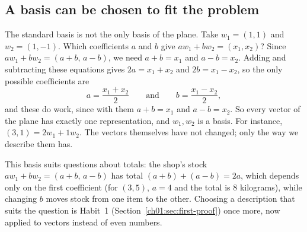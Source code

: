 \subsection*{A basis can be chosen to fit the problem}
The standard basis is not the only basis of the plane. Take $w_1=(1,1)$ and $w_2=(1,-1)$. Which coefficients $a$ and $b$ give $aw_1+bw_2=(x_1,x_2)$? Since $aw_1+bw_2=(a+b,\,a-b)$, we need $a+b=x_1$ and $a-b=x_2$. Adding and subtracting these equations gives $2a=x_1+x_2$ and $2b=x_1-x_2$, so the only possible coefficients are
\[
a=\frac{x_1+x_2}{2}\qquad\text{and}\qquad b=\frac{x_1-x_2}{2},
\]
and these do work, since with them $a+b=x_1$ and $a-b=x_2$. So every vector of the plane has exactly one representation, and $w_1,w_2$ is a basis. For instance, $(3,1)=2w_1+1w_2$. The vectors themselves have not changed; only the way we describe them has.

This basis suits questions about totals: the shop's stock $aw_1+bw_2=(a+b,\,a-b)$ has total $(a+b)+(a-b)=2a$, which depends only on the first coefficient (for $(3,5)$, $a=4$ and the total is $8$ kilograms), while changing $b$ moves stock from one item to the other. Choosing a description that suits the question is Habit~1 (Section~\ref{ch01:sec:first-proof}) once more, now applied to vectors instead of even numbers.
